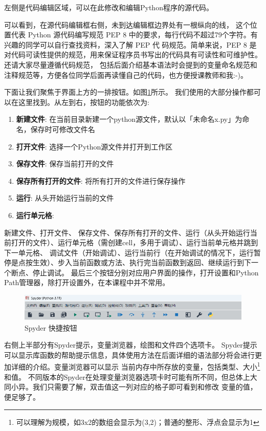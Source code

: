 左侧是代码编辑区域，可以在此修改和编辑Python程序的源代码。

可以看到，在源代码编辑框右侧，未到达编辑框边界处有一根纵向的线，
这个位置代表 Python 源代码编写规范 PEP 8 中的要求，每行代码不超过79个字符。有兴趣的同学可以自行查找资料，深入了解 PEP 代
码规范。简单来说，PEP 8 是对代码可读性提供的规范，用来保证程序员书写出的代码具有可读性和可维护性。还请大家尽量遵循代码规范，
包括后面介绍基本语法时会提到的变量命名规范和注释规范等，方便各位同学后面再读懂自己的代码，也方便授课教师和我:-)。

下面让我们聚焦于界面上方的一排按钮。如图\ref{fig:spyderMain_buttons}所示。
我们使用的大部分操作都可以在这里找到。从左到右，按钮的功能依次为: 
\begin{enumerate}
    \item \textbf{新建文件}: 在当前目录新建一个python源文件，默认以「未命名x.py」为命名，保存时可修改文件名
    \item \textbf{打开文件}: 选择一个Python源文件并打开到工作区
    \item \textbf{保存文件}: 保存当前打开的文件
    \item \textbf{保存所有打开的文件}: 将所有打开的文件进行保存操作
    \item \textbf{运行}: 从头开始运行当前的文件
    \item \textbf{运行单元格}: 
\end{enumerate}
新建文件、打开文件、
保存文件、保存所有打开的文件、运行（从头开始运行当前打开的文件）、运行单元格（需创建cell，多用于调试）、运行当前单元格并跳到下一单元格、
调试文件（开始调试）、运行当前行（在开始调试的情况下，运行暂停是点按生效）、步入当前函数或方法、执行完当前函数到返回、继续运行到下一个断点、停止调试。
最后三个按钮分别对应用户界面的操作，打开设置和Python Path管理器，除打开设置外，在本课程中并不常用。

\begin{figure}[htbp]
    \centering
    \includegraphics*[width=0.7\linewidth]{pic/spyder主界面-快捷按钮.png}
    \caption{Spyder 快捷按钮}
    \label{fig:spyderMain_buttons}
\end{figure}


右侧上半部分有Spyder提示，变量浏览器，绘图和文件四个选项卡。
Spyder提示可以显示库函数的帮助提示信息，具体使用方法在后面详细的语法部分将会进行更加详细的介绍。变量浏览器可以显示
当前内存中所存放的变量，包括类型、大小\footnote{可以理解为规模，如3x2的数组会显示为(3,2)；普通的整形、浮点会显示为1}和值。
不同版本的Spyder在处理变量浏览器选项卡时可能有所不同，但总体上大同小异。我们只需要了解，双击值这一列对应的格子即可看到和修改
变量的值，便足够了。

